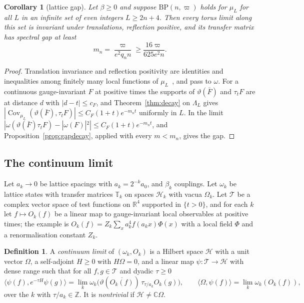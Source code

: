 \documentclass[11pt]{amsart}
\newtheorem{corollary}[theorem]{Corollary}
\theoremstyle{definition}
\newtheorem{definition}[theorem]{Definition}
\theoremstyle{remark}
\numberwithin{equation}{section}
\newcommand{\R}{\mathbb{R}}
\newcommand{\Z}{\mathbb{Z}}
\newcommand{\C}{\mathbb{C}}
\newcommand{\Cov}{\operatorname{Cov}}
\newcommand{\ip}[2]{\langle #1,#2\rangle}
\newcommand{\BP}{\mathrm{BP}}
\begin{document}
\begin{corollary}[lattice gap]\label{cor:latticegap}
Let $\beta\ge0$ and suppose $\BP(n,\varpi)$ holds for $\mu_L$ for all $L$ in an
infinite set of even integers $L\ge2n+4$. Then every torus limit along this
set is invariant under translations, reflection positive, and its transfer
matrix has spectral gap at least
\[
m_n=\frac{\varpi}{e^2q_nn}\ge\frac{16\varpi}{625e^2n}.
\]
\end{corollary}

\begin{proof}
Translation invariance and reflection positivity are identities and
inequalities among finitely many local functions of $\mu_L$~\cite{OSei78}, and
pass to $\omega$. For a continuous gauge-invariant $F$ at positive times the
supports of $\vartheta(\bar F)$ and $\tau_tF$ are at distance $d$ with $|d-t|\le
c_F$, and Theorem~\ref{thm:decay} on $\Lambda_L$ gives $|\Cov_{\mu_L}(\vartheta(\bar
F),\tau_tF)|\le C_F(1+t)e^{-m_nt}$ uniformly in $L$. In the limit
$|\omega(\vartheta(\bar F)\tau_tF)-|\omega(F)|^2|\le C_F(1+t)e^{-m_nt}$, and
Proposition~\ref{prop:gapdecay}, applied with every $m<m_n$, gives the gap.
\end{proof}

\subsection{The continuum limit}

Let $a_k\to0$ be lattice spacings with $a_k=2^{-k}a_0$, and $\beta_k$ couplings.
Let $\omega_k$ be lattice states with transfer matrices $\mathbb T_k$ on spaces
$\mathcal H_k$ with vacua $\Omega_k$. Let $\mathcal T$ be a complex vector space of
test functions on $\R^4$ supported in $\{t>0\}$, and for each $k$ let $f\mapsto
O_k(f)$ be a linear map to gauge-invariant local observables at positive
times; the example is $O_k(f)=Z_k\sum_xa_k^4f(a_kx)\Phi(x)$ with a local field
$\Phi$ and a renormalisation constant $Z_k$.

\begin{definition}\label{def:limit}
A \emph{continuum limit} of $(\omega_k,O_k)$ is a Hilbert space $\mathcal H$ with
a unit vector $\Omega$, a self-adjoint $H\ge0$ with $H\Omega=0$, and a linear
map $\psi:\mathcal T\to\mathcal H$ with dense range such that for all
$f,g\in\mathcal T$ and dyadic $\tau\ge0$
\[
\ip{\psi(f)}{e^{-\tau H}\psi(g)}=\lim_k\omega_k\bigl(\vartheta(\overline{O_k(f)})
\,\tau_{\tau/a_k}O_k(g)\bigr),\qquad
\ip\Omega{\psi(f)}=\lim_k\omega_k(O_k(f)),
\]
over the $k$ with $\tau/a_k\in\Z$. It is \emph{nontrivial} if $\mathcal H\ne\C
\Omega$.
\end{definition}
\end{document}
